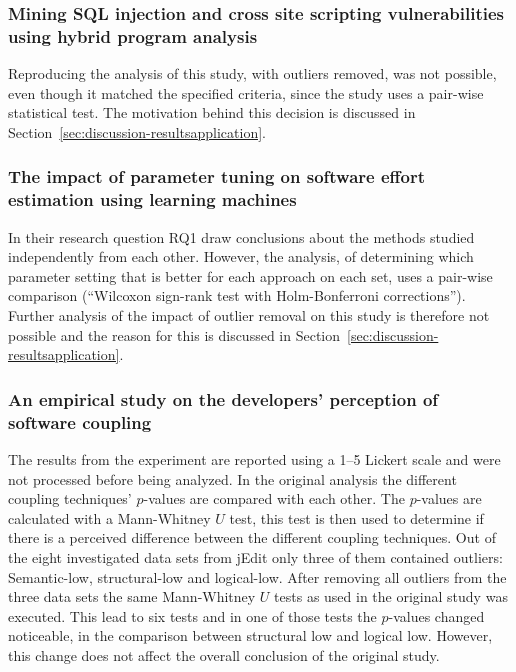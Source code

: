 \subsubsection{Mining SQL injection and cross site scripting vulnerabilities using hybrid program analysis}
Reproducing the analysis of this study, with outliers removed, was not possible, even though it matched the specified criteria, since the study uses a pair-wise statistical test. The motivation behind this decision is discussed in Section~\ref{sec:discussion-resultsapplication}.




\subsubsection{The impact of parameter tuning on software effort estimation using learning machines}
In their research question RQ1 \citet{song2013impact} draw conclusions about the methods studied independently from each other. However, the analysis, of determining which parameter setting that is better for each approach on each set, uses a pair-wise comparison (``Wilcoxon sign-rank test with Holm-Bonferroni corrections''). Further analysis of the impact of outlier removal on this study is therefore not possible and the reason for this is discussed in Section~\ref{sec:discussion-resultsapplication}.




\subsubsection{An empirical study on the developers' perception of software coupling}
The results from the experiment are reported using a 1--5 Lickert scale and were not processed before being analyzed. In the original analysis the different coupling techniques' $p$-values are compared with each other. The $p$-values are calculated with a Mann-Whitney $U$ test, this test is then used to determine if there is a perceived difference between the different coupling techniques. Out of the eight investigated data sets from jEdit only three of them contained outliers: Semantic-low, structural-low and logical-low. After removing all outliers from the three data sets the same Mann-Whitney $U$ tests as used in the original study was executed. This lead to six tests and in one of those tests the $p$-values changed noticeable, in the comparison between structural low and logical low. However, this change does not affect the overall conclusion of the original study. 



